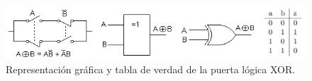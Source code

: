 \documentclass[a4paper, 11pt, titlepage]{article}
\begin{document}
    \begin{figure}[htp]
      \centering
      \includegraphics[width=1\textwidth]{resources/boole-xor.png}
      \caption{Representación gráfica y tabla de verdad de la puerta lógica XOR.}
      \label{boole-xor}
    \end{figure}
\end{document}
